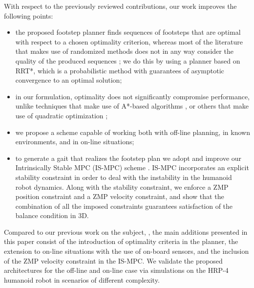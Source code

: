 With respect to the previously reviewed contributions, our work improves the following points:

\begin{itemize}
\item the proposed footstep planner finds sequences of footsteps that are optimal with respect to a chosen optimality criterion, whereas most of the literature that makes use of randomized methods does not in any way consider the quality of the produced sequences \cite{Liu_IROS2012}; we do this by using a planner based on RRT*, which is a probabilistic method with guarantees of asymptotic convergence to an optimal solution;

\item in our formulation, optimality does not significantly compromise performance, unlike techniques that make use of A*-based algorithms \cite{Chestnutt_IROS2009,Maier_IROS2013,Karkowski_HUM2016}, or others that make use of quadratic optimization \cite{DeTe:14};

\item we propose a scheme capable of working both with off-line planning, in known environments, and in on-line situations;


\item to generate a gait that realizes the footstep plan we adopt and improve our Intrinsically Stable MPC (IS-MPC) scheme \cite{ScDeLaOr:20}. IS-MPC incorporates an explicit stability constraint in order to deal with the instability in the humanoid robot dynamics. Along with the stability constraint, we enforce a ZMP position constraint and a ZMP velocity constraint, and show that the combination of all the imposed constraints guarantees satisfaction of the balance condition in 3D.

\end{itemize}


Compared to our previous work on the subject, \cite{FeScLaOr:19}, the main additions presented in this paper consist of the introduction of optimality criteria in the planner, the extension to on-line situations with the use of on-board sensors, and the inclusion of the ZMP velocity constraint in the IS-MPC. We validate the proposed architectures for the off-line and on-line case via simulations on the HRP-4 humanoid robot in scenarios of different complexity.


